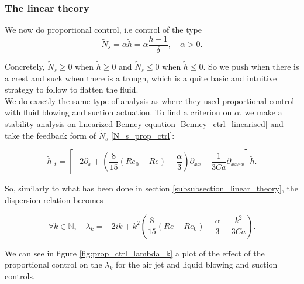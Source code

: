 \documentclass[12pt]{article}
\begin{document}
\subsubsection{The linear theory}


We now do proportional control, i.e control of the type 
\begin{equation}\label{N_s_prop_ctrl}
    \tilde{N}_s = \alpha\tilde{h} = \alpha \frac{h-1}{\delta}, \quad \alpha >0.
\end{equation}

Concretely, $\tilde{N}_s \geq0$ when $\tilde{h}\geq0$ and $\tilde{N}_s \leq 0$ when $\tilde{h}\leq0$. So we push when there is a crest
 and suck when there is a trough, which is a quite basic and intuitive strategy to follow to flatten the fluid. 
\\

 We do exactly the same type of analysis as \cite{Thompson_2016_prop_ctrl} where they used proportional control with fluid blowing and suction actuation. To find a criterion on $\alpha$, we make a stability analysis on linearized Benney equation \eqref{Benney_ctrl_linearised} and take the feedback form of $\tilde{N}_s$ \eqref{N_s_prop_ctrl}:  

\begin{equation}
\tilde{h}_{,t} = \left[ -2\partial_x + \left( \frac{8}{15}(Re_0-Re)+\frac{\alpha}{3}\right)\partial_{xx} - \frac{1}{3Ca}\partial_{xxxx}\right]\tilde{h}.
\end{equation}

So, similarly to what has been done in section \ref{subsubsection_linear_theory}, the dispersion relation becomes

\begin{equation}\label{eq_dispertion_prop_ctrl}
    \forall k\in \mathbb{N},\quad \lambda_k = -2ik+ k^2\left(\frac{8}{15}(Re-Re_0)-\frac{\alpha}{3}-\frac{k^2}{3Ca}\right).
\end{equation}

We can see in figure \ref{fig:prop_ctrl_lambda_k} a plot of the effect of the proportional control on the $\lambda_k$ for the air jet 
and liquid blowing and suction controls.
\end{document}
